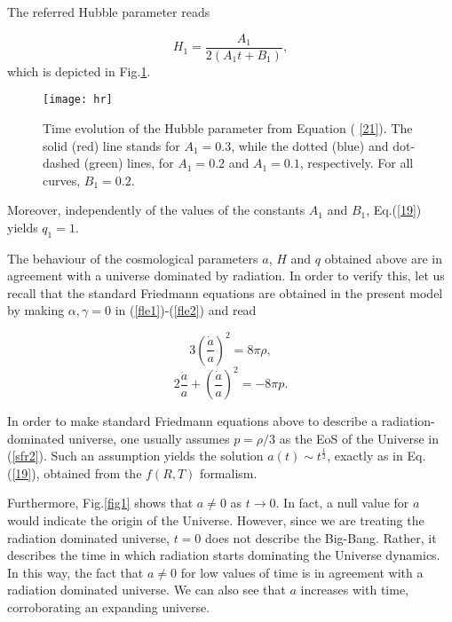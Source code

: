 The referred Hubble parameter reads

\begin{equation} \label{21}
H_1=\frac{A_{1}}{2(A_{1}t+B_{1})},
\end{equation}
which is depicted in Fig.\ref{fig2}.

\begin{figure}[ht!]
\vspace{0.3cm} \centering
\texttt{[image: hr]}
\caption{Time evolution of the Hubble parameter from Equation (%
\protect\ref{21}). The solid (red) line stands for $A_1=0.3$, while the dotted (blue) and dot-dashed (green) lines, for $A_1=0.2$ and $A_1=0.1$, respectively. For all curves, $B_1=0.2$.}
\label{fig2}
\end{figure}

Moreover, independently of the values of the constants $A_{1}$ and $B_{1}$, Eq.(\ref{19}) yields $q_1=1$.

The behaviour of the cosmological parameters $a$, $H$ and $q$ obtained above
are in agreement with a universe dominated by radiation. In order to verify
this, let us recall that the standard Friedmann equations are obtained in
the present model by making $\alpha,\gamma=0$ in (\ref{fle1})-(\ref{fle2})
and read

\begin{equation}  \label{sfr1}
3\left(\frac{\dot{a}}{a}\right)^{2}=8\pi\rho,
\end{equation}
\begin{equation}  \label{sfr2}
2\frac{\ddot{a}}{a}+\left(\frac{\dot{a}}{a}\right)^{2}=-8\pi p.
\end{equation}

In order to make standard Friedmann equations above to describe a
radiation-dominated universe, one usually assumes $p=\rho/3$ as the EoS of
the Universe in (\ref{sfr2}). Such an assumption yields the solution $%
a(t)\sim t^{\frac{1}{2}}$, exactly as in Eq.(\ref{19}), obtained from the $%
f(R,T)$ formalism.

Furthermore, Fig.\ref{fig1} shows that $a\neq0$ as $t\rightarrow0$. In fact,
a null value for $a$ would indicate the origin of the Universe. However,
since we are treating the radiation dominated universe, $t=0$ does not
describe the Big-Bang. Rather, it describes the time in which radiation
starts dominating the Universe dynamics. In this way, the fact that $a\neq0$
for low values of time is in agreement with a radiation dominated universe.
We can also see that $a$ increases with time, corroborating an expanding
universe.

